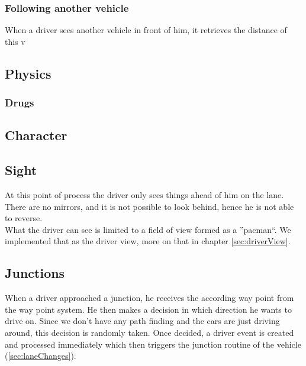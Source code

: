 \subsubsection{Following another vehicle}

When a driver sees another vehicle in front of him, it retrieves the distance
of this v

% 

\subsection{Physics}
\label{sec:physics}

\subsubsection{Drugs}
\label{sec:drugs}

\subsection{Character}
\label{sec:character}

\subsection{Sight}
\label{sec:sight}

At this point of process the driver only sees things ahead of him on the
lane. There are no mirrors, and it is not possible to look behind, hence
he is not able to reverse.\\

\noindent What the driver can see is limited to a field of view formed as 
a ''pacman``. We implemented that as the driver view, more on that in chapter 
\ref{sec:driverView}.

\subsection{Junctions}
\label{sec:driverJunctions}

When a driver approached a junction, he receives the according way point
from the way point system. He then makes a decision in which direction he
wants to drive on. Since we don't have any path finding and the cars are
just driving around, this decision is randomly taken. Once decided, a
driver event is created and processed immediately which then triggers
the junction routine of the vehicle (\ref{sec:laneChanges}).

